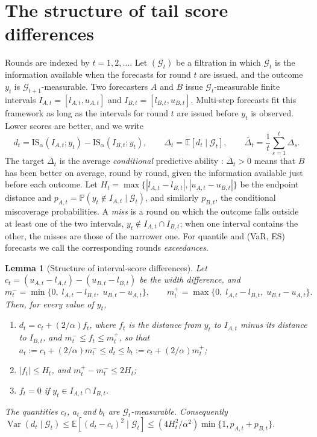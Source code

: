 \documentclass[11pt]{article}
\newtheorem{lemma}{Lemma}
\theoremstyle{remark}
\theoremstyle{definition}
\newcommand{\E}{\mathbb{E}}
\renewcommand{\Pr}{\mathbb{P}}
\newcommand{\G}{\mathcal{G}}
\newcommand{\IS}{\mathrm{IS}}
\newcommand{\Dbar}{\bar\Delta}
\DeclareMathOperator{\Var}{Var}
\begin{document}
\section{The structure of tail score differences}
\label{sec:setup}

Rounds are indexed by $t=1,2,\ldots$. Let $(\G_t)$ be a filtration in
which $\G_t$ is the information available when the forecasts for round $t$
are issued, and the outcome $y_t$ is $\G_{t+1}$-measurable. Two forecasters
$A$ and $B$ issue $\G_t$-measurable finite intervals
$I_{A,t}=[l_{A,t},u_{A,t}]$ and $I_{B,t}=[l_{B,t},u_{B,t}]$. Multi-step
forecasts fit this framework as long as the intervals for round $t$ are
issued before $y_t$ is observed. Lower scores are better, and we write
\[
 d_t=\IS_\alpha(I_{A,t};y_t)-\IS_\alpha(I_{B,t};y_t),\qquad
 \Delta_t=\E[d_t\mid\G_t],\qquad
 \Dbar_t=\frac1t\sum_{s=1}^t\Delta_s .
\]
The target $\Dbar_t$ is the average \emph{conditional} predictive ability
\citep{giacomini2006tests,choe2024comparing}: $\Dbar_t>0$ means that $B$ has
been better on average, round by round, given the information available
just before each outcome.
Let $H_t=\max\{|l_{A,t}-l_{B,t}|,|u_{A,t}-u_{B,t}|\}$ be the endpoint
distance and $p_{A,t}=\Pr(y_t\notin I_{A,t}\mid\G_t)$, and similarly
$p_{B,t}$, the conditional miscoverage probabilities. A \emph{miss} is a
round on which the outcome falls outside at least one of the two
intervals, $y_t\notin I_{A,t}\cap I_{B,t}$; when one interval contains the
other, the misses are those of the narrower one. For quantile and (VaR, ES)
forecasts we call the corresponding rounds \emph{exceedances}.

\begin{lemma}[Structure of interval-score differences]
\label{lem:structure}
Let $c_t=(u_{A,t}-l_{A,t})-(u_{B,t}-l_{B,t})$ be the width difference, and
\[
 m_t^-=\min\{0,\;l_{A,t}-l_{B,t},\;u_{B,t}-u_{A,t}\},\qquad
 m_t^+=\max\{0,\;l_{A,t}-l_{B,t},\;u_{B,t}-u_{A,t}\}.
\]
Then, for every value of $y_t$,
\begin{enumerate}
\item $d_t=c_t+(2/\alpha)f_t$, where $f_t$ is the distance from $y_t$ to
 $I_{A,t}$ minus its distance to $I_{B,t}$, and $m_t^-\le f_t\le m_t^+$, so that
 $a_t:=c_t+(2/\alpha)m_t^-\le d_t\le b_t:=c_t+(2/\alpha)m_t^+$;
\item $|f_t|\le H_t$, and $m_t^+-m_t^-\le 2H_t$;
\item $f_t=0$ if $y_t\in I_{A,t}\cap I_{B,t}$.
\end{enumerate}
The quantities $c_t$, $a_t$ and $b_t$ are $\G_t$-measurable. Consequently
$\Var(d_t\mid\G_t)\le\E[(d_t-c_t)^2\mid\G_t]
\le(4H_t^2/\alpha^2)\min\{1,p_{A,t}+p_{B,t}\}$.
\end{lemma}
\end{document}
